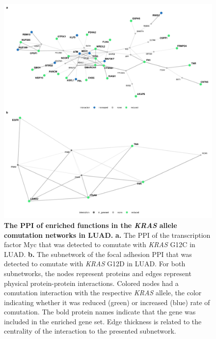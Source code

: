 \documentclass[english, 12pt, letterpaper]{article}
\newcommand{\KRAS}{\emph{KRAS}}
\begin{document}
\begin{figure}
\centering
\includegraphics[width=\textwidth]{figures/SuppFigure_11.jpeg}
\caption{
    \textbf{The PPI of enriched functions in the \KRAS{} allele comutation networks in LUAD.}
    \textbf{a.} The PPI of the transcription factor Myc that was detected to comutate with \KRAS{} G12C in LUAD.
    \textbf{b.} The subnetwork of the focal adhesion PPI that was detected to comutate with \KRAS{} G12D in LUAD.
    For both subnetworks, the nodes represent proteins and edges represent physical protein-protein interactions. Colored nodes had a comutation interaction with the respective \KRAS{} allele, the color indicating whether it was reduced (green) or increased (blue) rate of comutation.
    The bold protein names indicate that the gene was included in the enriched gene set.
    Edge thickness is related to the centrality of the interaction to the presented subnetwork.
}
\label{sfig:luad-enriched-comutation-ppi-examples}
\end{figure}
\end{document}
